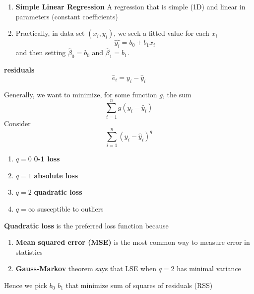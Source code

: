\documentclass[11pt]{article}
\begin{document}
\begin{defn*}
    \begin{enumerate}
        \item \textbf{Simple Linear Regression} A regression that is simple (1D) and linear in parameters (constant coefficients)
        \item Practically, in data set $(x_i, y_i)$, we seek a fitted value for each $x_i$ 
        \[
            \hat{y_i} = b_0 + b_1x_i
        \]
        and then setting $\hat{\beta}_0 = b_0$ and $\hat{\beta}_1 = b_1$. 
        \end{enumerate}
        \item \textbf{residuals} 
        \[
            \hat{e}_i = y_i - \hat{y}_i
        \]
        \item Generally, we want to minimize, for some function $g$, the sum
        \[
            \sum_{i=1}^n g(y_i - \hat{y}_i)
        \]
        Consider 
        \[
            \sum_{i=1}^n (y_i - \hat{y}_i)^q
        \]
        \begin{enumerate}
            \item $q = 0$ \textbf{0-1 loss}
            \item $q = 1$ \textbf{absolute loss} 
            \item $q = 2$ \textbf{quadratic loss} 
            \item $q = \infty$ susceptible to outliers
        \end{enumerate}
        \item \textbf{Quadratic loss} is the preferred loss function because 
        \begin{enumerate}
            \item \textbf{Mean squared error (MSE)} is the most common way to measure error in statistics
            \item \textbf{Gauss-Markov} theorem says that LSE when $q=2$ has minimal variance
        \end{enumerate}
        Hence we pick $b_0$ $b_1$ that minimize sum of squares of residuals (RSS)
\end{defn*}
\end{document}
